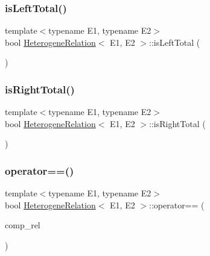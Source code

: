 \mbox{\label{classHeterogeneRelation_abbf37fad2ecbca677a17f18bd0289677}} 
\subsubsection{\texorpdfstring{is\+Left\+Total()}{isLeftTotal()}}
{\footnotesize\ttfamily template$<$typename E1, typename E2$>$ \\
bool \hyperlink{classHeterogeneRelation}{Heterogene\+Relation}$<$ E1, E2 $>$\+::is\+Left\+Total (\begin{DoxyParamCaption}{ }\end{DoxyParamCaption})\hspace{0.3cm}{\ttfamily [inline]}}

\mbox{\label{classHeterogeneRelation_acba9016716a59fa6293eed4bbe1e6e24}} 
\subsubsection{\texorpdfstring{is\+Right\+Total()}{isRightTotal()}}
{\footnotesize\ttfamily template$<$typename E1, typename E2$>$ \\
bool \hyperlink{classHeterogeneRelation}{Heterogene\+Relation}$<$ E1, E2 $>$\+::is\+Right\+Total (\begin{DoxyParamCaption}{ }\end{DoxyParamCaption})\hspace{0.3cm}{\ttfamily [inline]}}

\mbox{\label{classHeterogeneRelation_a4e877b05eca9b47d2eb3fc15d904ddd3}} 
\subsubsection{\texorpdfstring{operator==()}{operator==()}}
{\footnotesize\ttfamily template$<$typename E1, typename E2$>$ \\
bool \hyperlink{classHeterogeneRelation}{Heterogene\+Relation}$<$ E1, E2 $>$\+::operator== (\begin{DoxyParamCaption}\item[{const \hyperlink{classHeterogeneRelation}{Heterogene\+Relation}$<$ E1, E2 $>$}]{comp\+\_\+rel }\end{DoxyParamCaption})\hspace{0.3cm}{\ttfamily [inline]}}



